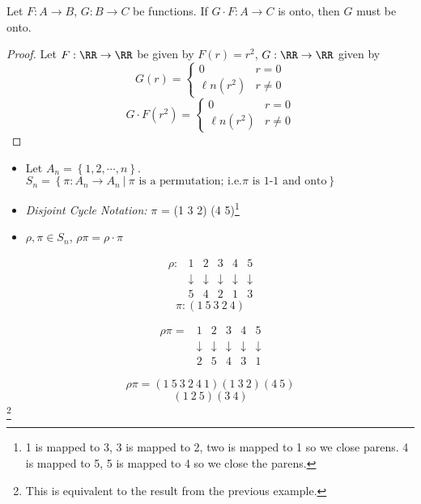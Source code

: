 \begin{proposition}
Let $F:A\to B$, $G:B\to C$ be functions. If $G\cdot F:A \to C$ is onto, then $G$ must be onto.
\end{proposition}
\begin{proof}
Let $F:\RR\to\RR$ be given by $F(r)=r^2$, $G:\RR\to\RR$ given by 
\[ G(r)=\left\{\begin{matrix} 0 & r = 0 \\ \ell n(r^2) & r \neq 0 \end{matrix} \right. \]
\[ G\cdot F(r^2)=\left\{\begin{matrix} 0 & r = 0 \\ \ell n(r^2) & r \neq 0 \end{matrix} \right. \]
\end{proof}
\begin{itemize}
\item Let $A_n=\left\{1,2,\cdots,n\right\}$. $S_n=\left\{\pi : A_n \to A_n\ |\ \pi \text{ is a permutation; i.e.} \pi \text{ is 1-1 and onto}\right\}$
\item \emph{Disjoint Cycle Notation:} $\pi$ = (1 3 2) (4 5)\footnote{1 is mapped to 3, 3 is mapped to 2, two is mapped to 1 so we close parens. 4 is mapped to 5, 5 is mapped to 4 so we close the parens.}
\item $\rho,\pi\in S_n$, $\rho\pi=\rho\cdot\pi$
\end{itemize}
\begin{example}
\[ \begin{matrix} \rho: &1 &2 &3 &4 &5 \\
                        &\downarrow&\downarrow&\downarrow&\downarrow&\downarrow \\
                        &5     &4     &2     &1     &3
   \end{matrix}
\]
\[ \pi: (1\ 5\ 3\ 2\ 4) \]
\end{example}
\begin{example}
\[ \begin{matrix} \rho\pi= &1 &2 &3 &4 &5 \\
                        &\downarrow&\downarrow&\downarrow&\downarrow&\downarrow \\
                        &2     &5     &4     &3     &1
   \end{matrix}
\]
\end{example}
\begin{example}
\[ \rho\pi = (1\ 5\ 3\ 2\ 4\ 1)(1\ 3\ 2) (4\ 5)\]
\[ (1\ 2\ 5)(3\ 4)
\]\footnote{This is equivalent to the result from the previous example.}
\end{example}
